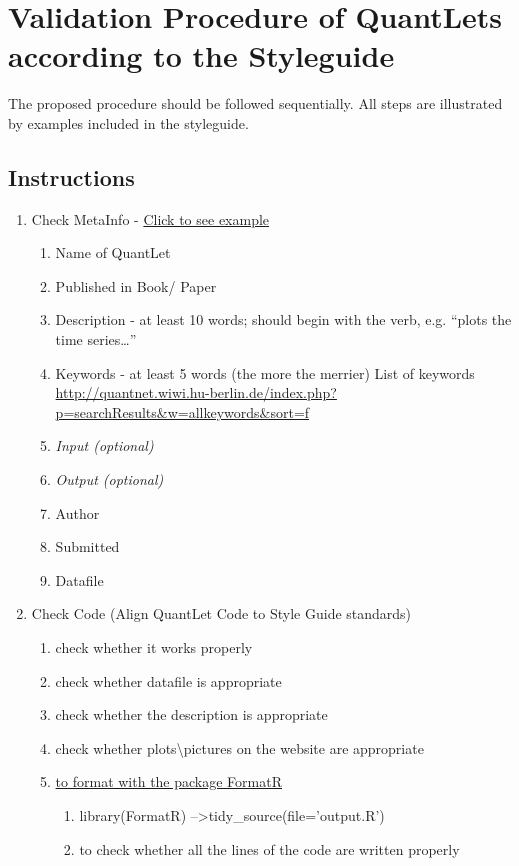 \documentclass{article}
\begin{document}
\section*{Validation Procedure of QuantLets according to the Styleguide}
The proposed procedure should be followed sequentially. All steps are illustrated by examples included in the styleguide.

\subsection*{Instructions} %
\begin{enumerate}
	\item Check MetaInfo - \label{MetaInfo-ini}\hyperref[MetaInfo]{Click to see example}
	\begin{enumerate}
		\item Name of QuantLet
		\item Published in Book/ Paper
		\item Description - at least 10 words; should begin 			with 			the verb, e.g. “plots the time series…”
		\item Keywords - at least 5 words (the more the 				merrier)
		List of keywords \url{http://quantnet.wiwi.hu-berlin.de/index.php?p=searchResults&w=allkeywords&sort=f}
		\item \textit{Input (optional)}
		\item \textit{Output (optional)}
		\item Author
		\item Submitted
		\item Datafile
	\end{enumerate}
	\item Check Code (Align QuantLet Code to Style Guide 			standards) 
	\begin {enumerate}
		\item check whether it works properly
		\item check whether datafile is appropriate
		\item check whether the description is appropriate
		\item check whether plots\textbackslash pictures on 				the website are appropriate
		\item \label{formatR-ini}\hyperref[formatR]{to format with the package	FormatR}
			\begin{enumerate}
				\item library(FormatR)  --\textgreater 							 tidy\_source(file='output.R')
				\item to check whether all the lines of the 					code are written properly

\end{enumerate}
\end{enumerate}
\end{enumerate}
\end{document}
